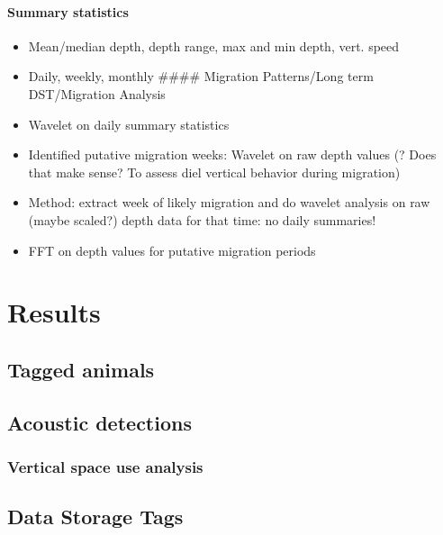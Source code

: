 \documentclass[
  authoryear,
  review,
  3p]{elsarticle}
\let\oldparagraph\paragraph
\renewcommand{\paragraph}[1]{\oldparagraph{#1}\mbox{}}
\providecommand{\tightlist}{%
  \setlength{\itemsep}{0pt}\setlength{\parskip}{0pt}}\usepackage{longtable,booktabs,array}
\begin{document}
\hypertarget{summary-statistics}{%
\paragraph{Summary statistics}\label{summary-statistics}}

\begin{itemize}
\tightlist
\item
  Mean/median depth, depth range, max and min depth, vert. speed
\item
  Daily, weekly, monthly \#\#\#\# Migration Patterns/Long term
  DST/Migration Analysis
\item
  Wavelet on daily summary statistics
\item
  Identified putative migration weeks: Wavelet on raw depth values (?
  Does that make sense? To assess diel vertical behavior during
  migration)
\item
  Method: extract week of likely migration and do wavelet analysis on
  raw (maybe scaled?) depth data for that time: no daily summaries!
\item
  FFT on depth values for putative migration periods
\end{itemize}

\hypertarget{sec-results}{%
\section{Results}\label{sec-results}}

\hypertarget{tagged-animals}{%
\subsection{Tagged animals}\label{tagged-animals}}

\hypertarget{acoustic-detections-1}{%
\subsection{Acoustic detections}\label{acoustic-detections-1}}

\hypertarget{vertical-space-use-analysis}{%
\subsubsection{Vertical space use
analysis}\label{vertical-space-use-analysis}}

\hypertarget{sec-results-dst}{%
\subsection{Data Storage Tags}\label{sec-results-dst}}
\end{document}
